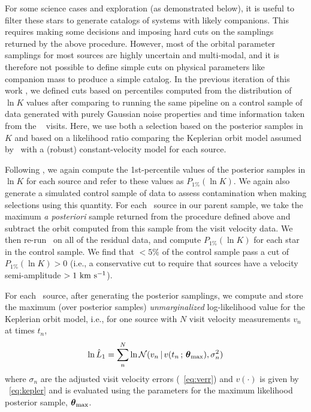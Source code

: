 \documentclass[modern]{aastex63}
\begin{document}
For some science cases and exploration (as demonstrated below), it is useful to
filter these stars to generate catalogs of systems with likely companions.
This requires making some decisions and imposing hard cuts on the samplings
returned by the above procedure.
However, most of the orbital parameter samplings for most sources are highly
uncertain and multi-modal, and it is therefore not possible to define simple
cuts on physical parameters like companion mass to produce a simple catalog.
In the previous iteration of this work \citep{Price-Whelan:2018}, we defined
cuts based on percentiles computed from the distribution of $\ln K$ values after
comparing to running the same pipeline on a control sample of data generated
with purely Gaussian noise properties and time information taken from the
\apogee\  visits.
Here, we use both a selection based on the posterior samples in $K$ and based on
a likelihood ratio comparing the Keplerian orbit model assumed by \thejoker\
with a (robust) constant-velocity model for each source.

Following \citet{Price-Whelan:2018}, we again compute the 1st-percentile values
of the posterior samples in $\ln K$ for each source and refer to these values as
$P_{1\%}(\ln K)$.
We again also generate a simulated control sample of data to assess
contamination when making selections using this quantity.
For each \apogee\ source in our parent sample, we take the maximum \textsl{a
posteriori} sample returned from the procedure defined above and subtract the
orbit computed from this sample from the visit velocity data.
We then re-run \thejoker\ on all of the residual data, and compute $P_{1\%}(\ln
K)$ for each star in the control sample.
We find that $<5\%$ of the control sample pass a cut of $P_{1\%}(\ln K) > 0$
(i.e., a conservative cut to require that sources have a velocity semi-amplitude
$> 1~\mathrm{km}~\mathrm{s}^{-1}$).

For each \apogee\ source, after generating the posterior samplings, we compute
and store the maximum (over posterior samples) \emph{unmarginalized}
log-likelihood value for the Keplerian orbit model, i.e., for one source with
$N$ visit velocity measurements $v_n$ at times $t_n$,
\begin{equation}
    \ln \hat{L}_1 = \sum_n^N \ln \mathcal{N}(v_n \given
        v(t_n \,;\, \bs{\theta}_{\mathrm{max}}), \sigma_n^2)
\end{equation}
where $\sigma_n$ are the adjusted visit velocity errors
(\equationname~\ref{eq:verr}) and $v(\cdot)$ is given by
\equationname~\ref{eq:kepler} and is evaluated using the parameters for the
maximum likelihood posterior sample, $\boldsymbol{\theta}_{\mathrm{max}}$.
\end{document}

